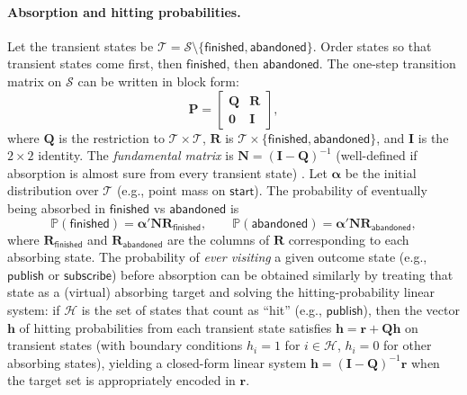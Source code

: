 \paragraph{Absorption and hitting probabilities.}
Let the transient states be $\mathcal{T} = \mathcal{S} \setminus \{\mathsf{finished},\mathsf{abandoned}\}$. Order states so that transient states come first, then $\mathsf{finished}$, then $\mathsf{abandoned}$. The one-step transition matrix on $\mathcal{S}$ can be written in block form:
\begin{equation}
  \mathbf{P} = \begin{bmatrix} \mathbf{Q} & \mathbf{R} \\ \mathbf{0} & \mathbf{I} \end{bmatrix},
\end{equation}
where $\mathbf{Q}$ is the restriction to $\mathcal{T} \times \mathcal{T}$, $\mathbf{R}$ is $\mathcal{T} \times \{\mathsf{finished},\mathsf{abandoned}\}$, and $\mathbf{I}$ is the $2\times 2$ identity. The \emph{fundamental matrix} is $\mathbf{N} = (\mathbf{I} - \mathbf{Q})^{-1}$ (well-defined if absorption is almost sure from every transient state) \citep{kemeny1976finite, norris1997markov}. Let $\boldsymbol{\alpha}$ be the initial distribution over $\mathcal{T}$ (e.g., point mass on $\mathsf{start}$). The probability of eventually being absorbed in $\mathsf{finished}$ vs $\mathsf{abandoned}$ is
\begin{equation}
  \mathbb{P}(\mathsf{finished}) = \boldsymbol{\alpha}' \mathbf{N} \mathbf{R}_{\mathsf{finished}}, \qquad \mathbb{P}(\mathsf{abandoned}) = \boldsymbol{\alpha}' \mathbf{N} \mathbf{R}_{\mathsf{abandoned}}, \label{eq:absorb-prob}
\end{equation}
where $\mathbf{R}_{\mathsf{finished}}$ and $\mathbf{R}_{\mathsf{abandoned}}$ are the columns of $\mathbf{R}$ corresponding to each absorbing state. The probability of \emph{ever visiting} a given outcome state (e.g., $\mathsf{publish}$ or $\mathsf{subscribe}$) before absorption can be obtained similarly by treating that state as a (virtual) absorbing target and solving the hitting-probability linear system: if $\mathcal{H}$ is the set of states that count as ``hit'' (e.g., $\mathsf{publish}$), then the vector $\mathbf{h}$ of hitting probabilities from each transient state satisfies $\mathbf{h} = \mathbf{r} + \mathbf{Q}\mathbf{h}$ on transient states (with boundary conditions $h_i = 1$ for $i \in \mathcal{H}$, $h_i = 0$ for other absorbing states), yielding a closed-form linear system $\mathbf{h} = (\mathbf{I}-\mathbf{Q})^{-1}\mathbf{r}$ when the target set is appropriately encoded in $\mathbf{r}$.

